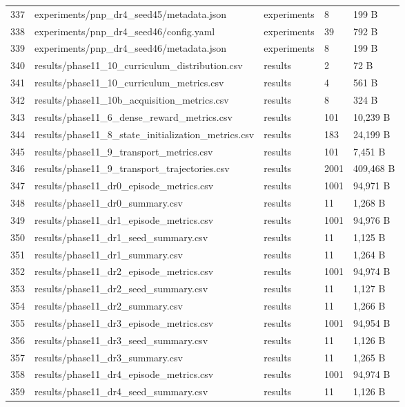 \documentclass[11pt,a4paper,oneside]{book}
\begin{document}
\begin{longtable}{l l l l l}
337 & experiments/pnp\_dr4\_seed45/metadata.json & experiments & 8 & 199 B \\
338 & experiments/pnp\_dr4\_seed46/config.yaml & experiments & 39 & 792 B \\
339 & experiments/pnp\_dr4\_seed46/metadata.json & experiments & 8 & 199 B \\
340 & results/phase11\_10\_curriculum\_distribution.csv & results & 2 & 72 B \\
341 & results/phase11\_10\_curriculum\_metrics.csv & results & 4 & 561 B \\
342 & results/phase11\_10b\_acquisition\_metrics.csv & results & 8 & 324 B \\
343 & results/phase11\_6\_dense\_reward\_metrics.csv & results & 101 & 10,239 B \\
344 & results/phase11\_8\_state\_initialization\_metrics.csv & results & 183 & 24,199 B \\
345 & results/phase11\_9\_transport\_metrics.csv & results & 101 & 7,451 B \\
346 & results/phase11\_9\_transport\_trajectories.csv & results & 2001 & 409,468 B \\
347 & results/phase11\_dr0\_episode\_metrics.csv & results & 1001 & 94,971 B \\
348 & results/phase11\_dr0\_summary.csv & results & 11 & 1,268 B \\
349 & results/phase11\_dr1\_episode\_metrics.csv & results & 1001 & 94,976 B \\
350 & results/phase11\_dr1\_seed\_summary.csv & results & 11 & 1,125 B \\
351 & results/phase11\_dr1\_summary.csv & results & 11 & 1,264 B \\
352 & results/phase11\_dr2\_episode\_metrics.csv & results & 1001 & 94,974 B \\
353 & results/phase11\_dr2\_seed\_summary.csv & results & 11 & 1,127 B \\
354 & results/phase11\_dr2\_summary.csv & results & 11 & 1,266 B \\
355 & results/phase11\_dr3\_episode\_metrics.csv & results & 1001 & 94,954 B \\
356 & results/phase11\_dr3\_seed\_summary.csv & results & 11 & 1,126 B \\
357 & results/phase11\_dr3\_summary.csv & results & 11 & 1,265 B \\
358 & results/phase11\_dr4\_episode\_metrics.csv & results & 1001 & 94,974 B \\
359 & results/phase11\_dr4\_seed\_summary.csv & results & 11 & 1,126 B \\

\end{longtable}
\end{document}
